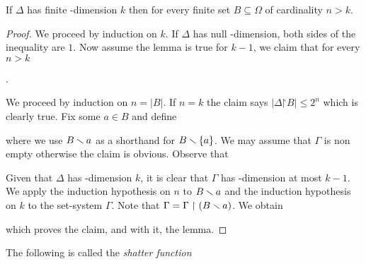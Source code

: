 \documentclass[creche.tex]{subfiles}
\begin{document}
\begin{proposition}\label{lem_Sauer}
If $\Delta$ has finite \vc-dimension $k$ then  for every finite set $B\subseteq\Omega$ of cardinality $n> k$.
\end{proposition}

\begin{proof}
We proceed by induction on $k$. If $\Delta$ has null \vc-dimension, both sides of the inequality are $1$. Now assume the lemma is true for $k-1$, we claim that for every $n> k$

.

We proceed by induction on $n=|B|$. If $n=k$ the claim says $|\Delta\mathord\restriction B|\le 2^n$ which is clearly true. Fix some $a\in B$ and define


where we use $B\smallsetminus a$ as a shorthand for $B\smallsetminus\{a\}$. We may assume that $\Gamma$ is non empty otherwise the claim is obvious. Observe that


Given that $\Delta$ has \vc-dimension $k$, it is clear that $\Gamma$ has \vc-dimension at most $k-1$. We apply the induction hypothesis on $n$ to $B\smallsetminus a$ and the induction hypothesis on $k$ to the set-system $\Gamma$. Note that $\Gamma=\Gamma\restriction(B\smallsetminus a)$. We obtain





which proves the claim, and with it, the lemma.
\end{proof}
The following is called the \emph{shatter function\/}

\end{document}
